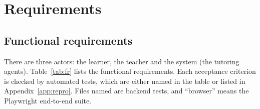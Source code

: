 \chapter{Requirements}
\section{Functional requirements}
There are three actors: the learner, the teacher and the system (the tutoring agents). Table~\ref{tab:fr} lists the functional requirements. Each acceptance criterion is checked by automated tests, which are either named in the table or listed in Appendix~\ref{app:repro}. Files named  are backend tests, and ``browser'' means the Playwright end-to-end suite.

\begingroup\small
\setlength{\tabcolsep}{3pt}\renewcommand{\arraystretch}{1.15}
